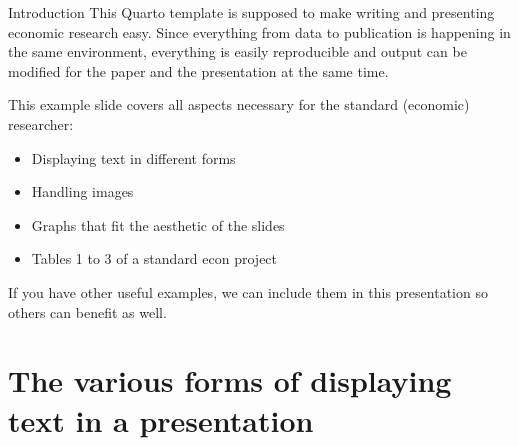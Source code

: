 \documentclass[11pt, aspectratio=169, t]{beamer}
\def\tightlist{}
\providecommand{\tightlist}{%
	\setlength{\itemsep}{0pt}\setlength{\parskip}{0pt}}
\begin{document}


\begin{frame}{Introduction}
\label{introduction}
This Quarto template is supposed to make writing and presenting economic
research easy. Since everything from data to publication is happening in
the same environment, everything is easily reproducible and output can
be modified for the paper and the presentation at the same time.

This example slide covers all aspects necessary for the standard
(economic) researcher:

\begin{itemize}
\tightlist
\item
  Displaying text in different forms
\item
  Handling images
\item
  Graphs that fit the aesthetic of the slides
\item
  Tables 1 to 3 of a standard econ project
\end{itemize}

If you have other useful examples, we can include them in this
presentation so others can benefit as well.
\end{frame}

\section{The various forms of displaying text in a
presentation}\label{the-various-forms-of-displaying-text-in-a-presentation}
\end{document}

